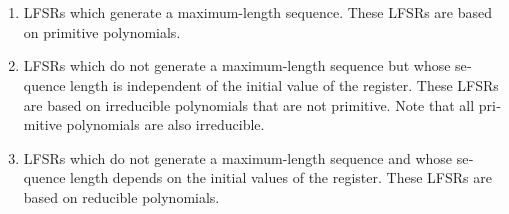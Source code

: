 \documentclass{article}
\begin{document}
\section{}%
\subsection{}
\begin{latin}
\begin{enumerate}
\item LFSRs which generate a maximum-length sequence. These LFSRs are based on
primitive polynomials.
\item LFSRs which do not generate a maximum-length sequence but whose sequence
length is independent of the initial value of the register. These LFSRs are based
on irreducible polynomials that are not primitive. Note that all primitive polynomials are also irreducible.
\item LFSRs which do not generate a maximum-length sequence and whose sequence
length depends on the initial values of the register. These LFSRs are based on
reducible polynomials.
\end{enumerate}
\end{latin}

\subsection{}
\end{document}

